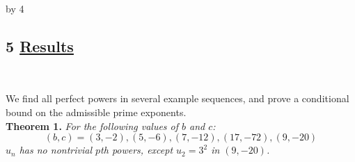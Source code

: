 \documentclass[12pt]{scrartcl}
\def\anzspalten{4}
\newlength{\kastenwidth}
\newenvironment{kasten}{%
  \begin{lrbox}{\dummybox}%
    \begin{minipage}{0.96\linewidth}}%
    {\end{minipage}%
  \end{lrbox}%
  \raisebox{-\depth}{\psshadowbox[framesep=1em]{\usebox{\dummybox}}}\\[0.5em]}
\newenvironment{spalte}{%
  \setlength\kastenwidth{1.2\textwidth}
  \divide\kastenwidth by \anzspalten
  \begin{minipage}[t]{\kastenwidth}}{\end{minipage}\hfill}
\begin{document}
\begin{lrbox}{\spalten}
{\begin{spalte}









\begin{kasten}
 \section*{5 \hspace{0.1cm} {\color{red} \underline{Results
}}}
\end{kasten}

\begin{kasten}

We find all perfect powers in several example sequences, and prove a conditional bound on the admissible prime exponents. \\

\textbf{\large \color{blue} Theorem 1.} \textit{For the following values of $b$ and $c$:
\[ (b,c) = (3,-2), (5,-6), (7,-12), (17,-72), (9,-20) \]
$u_n$ has no nontrivial $p$th powers, except $u_2 = 3^2$ in $(9,-20)$.} \\


\end{kasten}
\end{spalte}}
\end{lrbox}
\end{document}
